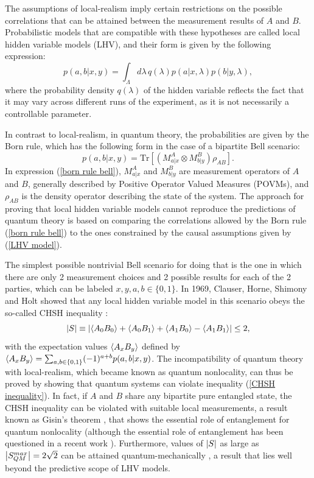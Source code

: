 \documentclass[aps,pra,reprint, superscriptaddress,showkeys]{revtex4-2}
\theoremstyle{plain}
\begin{document}
The assumptions of local-realism imply certain restrictions on the possible correlations that can be attained between the measurement results of $A$ and $B$. Probabilistic models that are compatible with these hypotheses are called local hidden variable models (LHV), and their form is given by the following expression:
\begin{equation}
    p(a,b|x,y) = \int_{\Lambda} d\lambda\, q(\lambda) p(a|x,\lambda)p(b| y,\lambda),
    \label{LHV model}
\end{equation}
where the probability density $q(\lambda)$ of the hidden variable reflects the fact that it may vary across different runs of the experiment, as it is not necessarily a controllable parameter.

In contrast to local-realism, in quantum theory, the probabilities are given by the Born rule, which has the following form in the case of a bipartite Bell scenario:
\begin{equation}
    p(a,b|x,y) = \mathrm{Tr}\left[(M^A_{a|x}\otimes M^B_{b|y}) \rho_{AB}\right].
    \label{born rule bell}
\end{equation}
In expression (\ref{born rule bell}), $M^A_{a|x}$ and $M^B_{b|y}$ are measurement operators of $A$ and $B$, generally described by Positive Operator Valued Measures (POVMs), and $\rho_{AB}$ is the density operator describing the state of the system. The approach for proving that local hidden variable models cannot reproduce the predictions of quantum theory is based on comparing the correlations allowed by the Born rule (\ref{born rule bell}) to the ones constrained by the causal assumptions given by (\ref{LHV model}).

The simplest possible nontrivial Bell scenario for doing that is the one in which there are only 2 measurement choices and 2 possible results for each of the 2 parties, which can be labeled $x,y,a,b\in\{0,1\}$. In 1969, Clauser, Horne, Shimony and Holt showed that any local hidden variable model in this scenario obeys the so-called CHSH inequality \cite{Clauser1969}:
\begin{equation}
\abs{S}\equiv\abs{\expval{A_0 B_0} + \expval{A_0B_1} + \expval{A_1 B_0} - \expval{A_1 B_1}}\leq 2,
    \label{CHSH inequality}
\end{equation}
with the expectation values $\expval{A_xB_y}$ defined by $\expval{A_xB_y} = \sum_{a,b\in\{0,1\}}(-1)^{a+b}p(a,b|x,y)$. The incompatibility of quantum theory with local-realism, which became known as quantum nonlocality, can thus be proved by showing that quantum systems can violate inequality (\ref{CHSH inequality}). In fact, if $A$ and $B$ share any bipartite pure entangled state, the CHSH inequality can be violated with suitable local measurements, a result known as Gisin's theorem \cite{gisin1991bells}, that shows the essential role of entanglement for quantum nonlocality (although the essential role of entanglement has been questioned in a recent work \cite{wang2025violation}). Furthermore, values of $\abs{S}$ as large as $\abs{S^{max}_{QM}} = 2\sqrt{2}$ can be attained quantum-mechanically \cite{cirel1980quantum}, a result that lies well beyond the predictive scope of LHV models.
\end{document}
